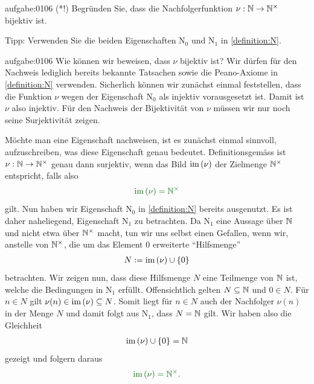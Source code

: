 \begin{aufgabe}{aufgabe:0106}
(*!) Begründen Sie, dass die Nachfolgerfunktion $\nu:\mathbb{N}\to\mathbb{N}^{\times}$ bijektiv ist.

\noindent
Tipp: Verwenden Sie die beiden Eigenschaften N$_0$ und N$_1$ in \cref{definition:N}.
\end{aufgabe}
\begin{antwort}{aufgabe:0106}
Wie können wir beweisen, dass $\nu$ bijektiv ist? Wir dürfen für den Nachweis lediglich bereits bekannte Tatsachen sowie die Peano-Axiome in \cref{definition:N} verwenden. Sicherlich können wir zunächst einmal feststellen, dass die Funktion $\nu$ wegen der Eigenschaft N$_0$ als injektiv vorausgesetzt ist. Damit ist $\nu$ also injektiv. Für den Nachweis der Bijektivität von $\nu$ müssen wir nur noch seine Surjektivität zeigen.

Möchte man eine Eigenschaft nachweisen, ist es zunächst einmal sinnvoll, aufzuschreiben, was diese Eigenschaft genau bedeutet. Definitionsgemäss ist $\nu:\mathbb{N}\to\mathbb{N}^{\times}$ genau dann surjektiv, wenn das Bild $\text{im}\left(\nu\right)$ der Zielmenge $\mathbb{N}^{\times}$ entspricht, falls also
\begin{align*}
    \textcolor{DarkGreen}{\text{im}\lr{\nu} = \Nunit}
\end{align*}
gilt. Nun haben wir Eigenschaft N$_0$ in \cref{definition:N} bereits ausgenutzt. Es ist daher naheliegend, Eigenschaft N$_1$ zu betrachten. Da N$_1$ eine Aussage über $\mathbb{N}$ und nicht etwa über $\mathbb{N}^{\times}$ macht, tun wir uns selbst einen Gefallen, wenn wir, anstelle von $\mathbb{N}^{\times}$, die um das Element $0$ erweiterte \enquote{Hilfsmenge}
\begin{align*}
    N := \text{im}\left(\nu\right) \cup \left\{0\right\}
\end{align*}
betrachten. Wir zeigen nun, dass diese Hilfsmenge $N$ eine Teilmenge von $\mathbb{N}$ ist, welche die Bedingungen in N$_1$ erfüllt. Offensichtlich gelten $N\subseteq \mathbb{N}$ und $0\in N$. Für $n\in N$ gilt $\nu(n)\in\text{im}\left(\nu\right)\subseteq N$. Somit liegt für $n\in N$ auch der Nachfolger $\nu(n)$ in der Menge $N$ und damit folgt aus N$_1$, dass $N = \mathbb{N}$ gilt. Wir haben also die Gleichheit
\begin{align*}
    \text{im}\left(\nu\right) \cup \left\{0\right\} = \mathbb{N}
\end{align*}
gezeigt und folgern daraus
\begin{align*}
    \textcolor{DarkGreen}{\text{im}\lr{\nu} = \Nunit}.
\end{align*}
\end{antwort}

